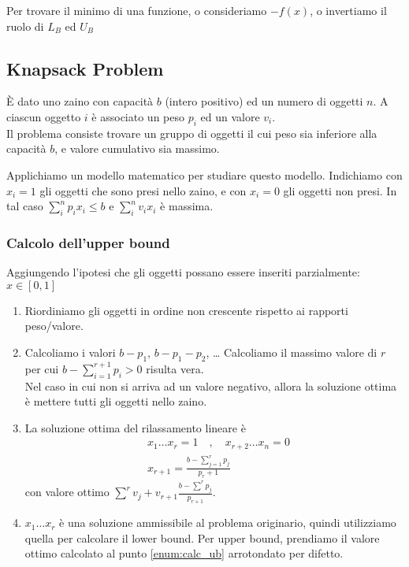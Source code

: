\documentclass[../template]{subfiles}
\begin{document}
Per trovare il minimo di una funzione, o consideriamo $-f(x)$, o invertiamo il ruolo di $L_B$ ed $U_B$

\subsection{Knapsack Problem}
È dato uno zaino con capacità $b$ (intero positivo) ed un numero di oggetti $n$.
A ciascun oggetto $i$ è associato un peso $p_i$ ed un valore $v_i$.
\\
Il problema consiste trovare un gruppo di oggetti il cui peso sia inferiore alla capacità $b$, e valore cumulativo sia massimo.

Applichiamo un modello matematico per studiare questo modello.
Indichiamo con $x_i = 1$ gli oggetti che sono presi nello zaino, e con $x_i = 0$ gli oggetti non presi.
In tal caso $\sum^n_i p_i x_i \le b$ e $\sum_i^n v_i x_i$ è massima.
\subsubsection{Calcolo dell'upper bound}
Aggiungendo l'ipotesi che gli oggetti possano essere inseriti parzialmente: $x \in [0,1]$
\begin{enumerate}
    \item Riordiniamo gli oggetti in ordine non crescente rispetto ai rapporti peso/valore.
    \item Calcoliamo i valori $b - p_1$, $b - p_1 - p_2$, \ldots
        Calcoliamo il massimo valore di $r$ per cui $b - \sum^{r+1}_{i=1} p_i > 0$ risulta vera.
        \\
        Nel caso in cui non si arriva ad un valore negativo, allora la soluzione ottima è mettere tutti gli oggetti nello zaino.
    \item \label{enum:calc_ub} La soluzione ottima del rilassamento lineare è
        \begin{align*}
            &x_1\dots x_r = 1 \quad , \quad x_{r+2} \dots x_n = 0 \\
            &x_{r+1} = \frac{b - \sum^r_{j=1} p_j}{p_r +1}
        \end{align*}
        con valore ottimo $\sum^r v_j + v_{r+1}\frac{b - \sum^r p_j}{p_{r+1}}$.
    \item $x_1 \dots x_r$ è una soluzione ammissibile al problema originario, quindi utilizziamo quella per calcolare il lower bound.
        Per upper bound, prendiamo il valore ottimo calcolato al punto \ref{enum:calc_ub} arrotondato per difetto.
\end{enumerate}
\end{document}
